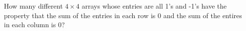 How many different $4\times 4$ arrays whose entries are all 1's and -1's have the property that the sum of the entries in each row is 0 and the sum of the entires in each column is 0?